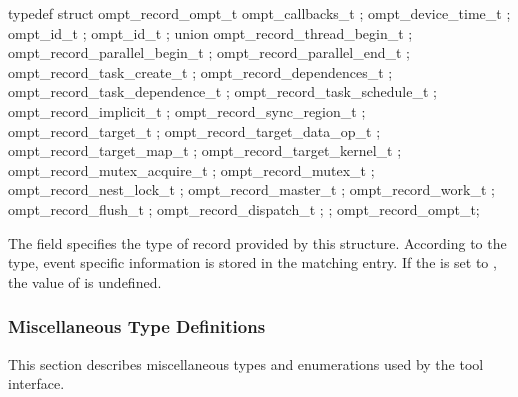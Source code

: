 \label{sec:ompt_record_ompt_t}

\begin{ccppspecific}
\begin{omptRecord}
typedef struct ompt_record_ompt_t {
  ompt_callbacks_t ;
  ompt_device_time_t ;
  ompt_id_t ;
  ompt_id_t ;
  union {
    ompt_record_thread_begin_t ;
    ompt_record_parallel_begin_t ;
    ompt_record_parallel_end_t ;
    ompt_record_task_create_t ;
    ompt_record_dependences_t ;
    ompt_record_task_dependence_t ;
    ompt_record_task_schedule_t ;
    ompt_record_implicit_t ;
    ompt_record_sync_region_t ;
    ompt_record_target_t ;
    ompt_record_target_data_op_t ;
    ompt_record_target_map_t ;
    ompt_record_target_kernel_t ;
    ompt_record_mutex_acquire_t ;
    ompt_record_mutex_t ;
    ompt_record_nest_lock_t ;
    ompt_record_master_t ;
    ompt_record_work_t ;
    ompt_record_flush_t ;
    ompt_record_dispatch_t ;
  } ;
} ompt_record_ompt_t;
\end{omptRecord}
\end{ccppspecific}


\descr
The field  specifies the type of record provided by this
structure.
According to the type, event specific information is stored in the matching
 entry.
\restrictions
If the  is set to , the value
of  is undefined.


\subsubsection{Miscellaneous Type Definitions}
\label{sec:ompt-types:misc}
This section describes miscellaneous types and enumerations used by the tool interface.

\label{sec:ompt_callback_t}

